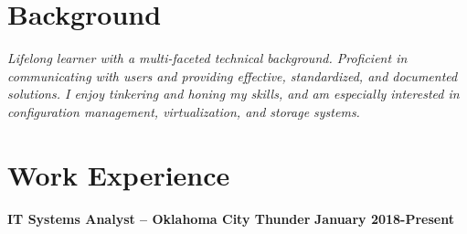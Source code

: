\documentclass[centered]{res}
\begin{document}

\address{Oklahoma City, OK \\ trjean.ou@gmail.com \\ (580) 304-6896 }

\begin{resume}
	
\section{Background}
\emph{Lifelong learner with a multi-faceted technical background. Proficient in communicating with users and providing effective, standardized, and documented solutions. I enjoy tinkering and honing my skills, and am especially interested in configuration management, virtualization, and storage systems.}
\vspace{-24pt}
\section{Work Experience}
\textbf{IT Systems Analyst -- Oklahoma City Thunder}
\newline
\textbf{January 2018-Present}



\end{resume}
\end{document}
